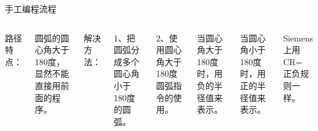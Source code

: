 \documentclass[UTF8,zihao=-4]{ctexbeamer}
\begin{document}
\begin{frame}{手工编程流程}
    \begin{columns}
        \column{\textwidth}
        
        路径特点：
        
        圆弧的圆心角大于180度，显然不能直接用前面的程序。
        
        解决方法：
        
        
        1、把圆弧分成多个圆心角小于180度的圆弧。
        
        2、使用圆心角大于180度圆弧指令的使用。
        
              
        当圆心角大于180度时，用负的半径值来表示。
        
        当圆心角小于180度时，用正的半径值来表示。
        
        Siemens上用CR= 正负规则一样。
        
    \end{columns}
\end{frame}
\end{document}
